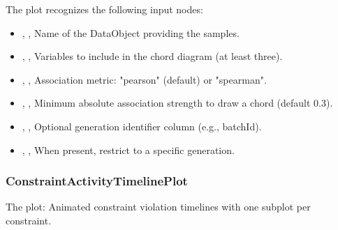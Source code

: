 The  plot recognizes the following input nodes:
\begin{itemize}
  \item {}, , Name of the DataObject providing the samples.
  \item {}, , Variables to include in the chord diagram (at least three).
  \item {}, , Association metric: "pearson" (default) or "spearman".
  \item {}, , Minimum absolute association strength to draw a chord (default 0.3).
  \item {}, , Optional generation identifier column (e.g., batchId).
  \item {}, , When  present, restrict to a specific generation.
\end{itemize}

\subsubsection{ConstraintActivityTimelinePlot}
The   plot: Animated constraint violation timelines with one subplot per constraint.

